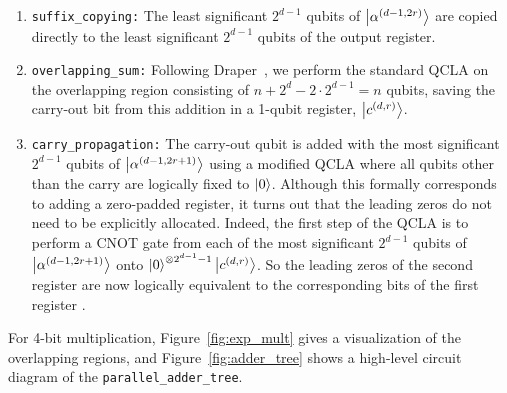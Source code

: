 \documentclass[reprint,amsmath,amssymb,aps,pra]{revtex4-2}
\begin{document}
\begin{enumerate}

\item \texttt{suffix\_copying:}
The least significant $2^{d-1}$ qubits of
$\ket{\alpha^{(d-1,2r)}}$
are copied directly to the least significant $2^{d-1}$ qubits of the output register.

\item \texttt{overlapping\_sum:}
Following Draper~\cite{Draper2004},
we perform the standard QCLA 
on the overlapping region consisting of 
$n + 2^d - 2\cdot 2^{d-1} = n$ qubits,
saving the carry-out bit from this addition
in a 1-qubit register,  $\ket{c^{(d,r)}}$.



\item \texttt{carry\_propagation:}
The carry-out qubit is added with the most significant $2^{d-1}$ qubits of
$\ket{\alpha^{(d-1,2r+1)}}$ using a modified QCLA where all qubits other than
the carry are logically fixed to $\ket{0}$. Although this formally corresponds
to adding a zero-padded register, it turns out that the leading zeros do not
need to be explicitly allocated. Indeed, the first step of the QCLA is to perform a CNOT
gate from each of the most significant $2^{d-1}$ qubits of
$\ket{\alpha^{(d-1,2r+1)}}$ onto $\ket{0}^{\otimes 2^{d-1} -1}\ket{c^{(d,r)}}$. So the leading
zeros of the second register are now logically equivalent to the corresponding bits of the first register \cite{Draper2004}.

\end{enumerate}









For 4-bit multiplication, Figure~\ref{fig:exp_mult} gives a visualization of the overlapping regions, and Figure~\ref{fig:adder_tree} shows a high-level circuit diagram of the \texttt{parallel\_adder\_tree}.
\end{document}
